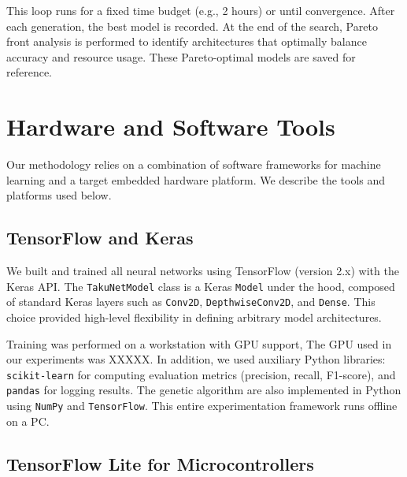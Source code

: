 This loop runs for a fixed time budget (e.g., 2 hours) or until convergence. After each generation, the best model is recorded. 
At the end of the search, Pareto front analysis is performed to identify architectures that optimally balance accuracy and resource usage. These Pareto-optimal models are saved for reference. 


























\section{Hardware and Software Tools}

Our methodology relies on a combination of software frameworks for machine learning and a target embedded hardware platform. We describe the tools and platforms used below.

\subsection*{TensorFlow and Keras}

We built and trained all neural networks using TensorFlow (version 2.x) with the Keras API. The \texttt{TakuNetModel} class is a Keras \texttt{Model} under the hood, composed of standard Keras layers such as \texttt{Conv2D}, \texttt{DepthwiseConv2D}, and \texttt{Dense}. This choice provided high-level flexibility in defining arbitrary model architectures.

Training was performed on a workstation with GPU support, The GPU used in our experiments was XXXXX.
In addition, we used auxiliary Python libraries: \texttt{scikit-learn} for computing evaluation metrics (precision, recall, F1-score), and \texttt{pandas} for logging results. The genetic algorithm are also implemented in Python using \texttt{NumPy} and \texttt{TensorFlow}. This entire experimentation framework runs offline on a PC.

\subsection*{TensorFlow Lite for Microcontrollers}

